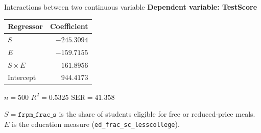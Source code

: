 \documentclass[notes,10pt, aspectratio=169]{beamer}
\begin{document}

\begin{frame}{Interactions between two continuous variable}
\textbf{Dependent variable: TestScore}
\begin{center}
\renewcommand{\arraystretch}{1.2}
\begin{tabular}{lr}
\toprule
Regressor & Coefficient \\
\midrule
$S$ & $-245.3094$ \\
$E$ & $-159.7155$ \\
$S \times E$ & $161.8956$ \\
Intercept & $944.4173$ \\
\bottomrule
\end{tabular}

\medskip
$n=500$ \qquad $R^2=0.5325$ \qquad $\mathrm{SER}=41.358$
\end{center}
\small $S=\texttt{frpm\_frac\_s}$ is the share of students eligible for free or reduced-price meals. $E$ is the education measure (\texttt{ed\_frac\_sc\_lesscollege}).
\end{frame}
\end{document}
